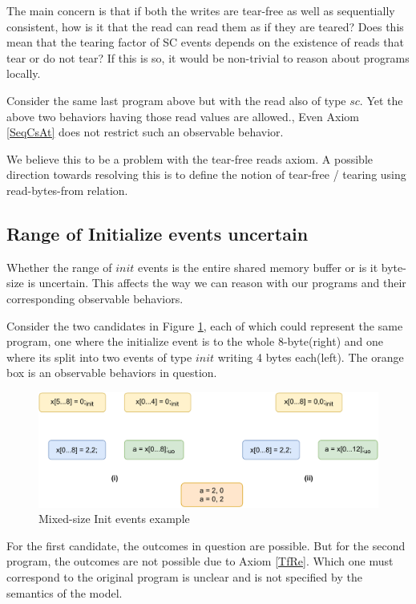         The main concern is that if both the writes are tear-free as well as sequentially consistent, how is it that the read can read them as if they are teared?
        Does this mean that the tearing factor of SC events depends on the existence of reads that tear or do not tear? 
        If this is so, it would be non-trivial to reason about programs locally.
       
        Consider the same last program above but with the read also of type $sc$. 
        Yet the above two behaviors having those read values are allowed.,
        Even Axiom \ref{SeqCsAt} does not restrict such an observable behavior.

        We believe this to be a problem with the tear-free reads axiom.
        A possible direction towards resolving this is to define the notion of tear-free / tearing using read-bytes-from relation. 

    \subsection{Range of Initialize events uncertain}

        Whether the range of $init$ events is the entire shared memory buffer or is it byte-size is uncertain.
        This affects the way we can reason with our programs and their corresponding observable behaviors.

        Consider the two candidates in Figure \ref{crit:range}, each of which could represent the same program, one where the initialize event is to the whole 8-byte(right) and one where its split into two events of type $init$ writing 4 bytes each(left).
        The orange box is an observable behaviors in question.
        \begin{figure}[H]
            \centering
            \includegraphics[scale=0.7]{6.ConclusionFutureWork/InitExample.pdf}
            \caption{Mixed-size Init events example}
            \label{crit:range}
        \end{figure}

        For the first candidate, the outcomes in question are possible.
        But for the second program, the outcomes are not possible due to Axiom \ref{TfRe}.
        Which one must correspond to the original program is unclear and is not specified by the semantics of the model.

